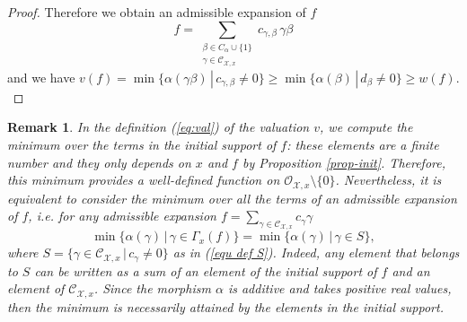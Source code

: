 \documentclass{amsart}%
\numberwithin{equation}{subsection}
\theoremstyle{plain2}
\theoremstyle{definition2}
\newtheorem{rem}[equation]{Remark}
\theoremstyle{stepstyle}
\theoremstyle{point}
\theoremstyle{subpoint}
\newcommand{\cX}{\ensuremath{\mathscr{X}}}
\newcommand{\caC}{\ensuremath{\mathcal{C}}}
\newcommand{\caO}{\ensuremath{\mathcal{O}}}
\begin{document}
\begin{proof}
Therefore we obtain an admissible expansion of $f$ $$f = \sum_{\substack{\beta \in C_\alpha \cup \{1\} \\ \gamma \in \caC_{\cX,x}}}c_{\gamma, \beta}\, \gamma\beta $$ and we have $v(f)=\min\{\alpha(\gamma \beta)\,|\,c_{\gamma, \beta}\neq 0\} \geqslant\min\{\alpha(\beta)\,|\,d_{\beta}\neq 0\} \geqslant w(f).$
\end{proof}
 
\begin{rem} \label{rem def-val}
In the definition (\ref{eq:val}) of the valuation $v$, we compute the minimum over the terms in the initial support of $f$: these elements are a finite number and they only depends on $x$ and $f$ by Proposition \ref{prop-init}. Therefore, this minimum provides a well-defined function on $\caO_{\cX,x} \setminus \{0\}$. Nevertheless, it is equivalent to consider the minimum over all the terms of an admissible expansion of $f$, i.e. for any admissible expansion $f=\sum_{\gamma \in \mathcal{C}_{\cX,x}}c_{\gamma}\gamma$ $$\min\{\alpha(\gamma)\,|\,\gamma\in \Gamma_x(f)\} = \min\{\alpha(\gamma)\,|\,\gamma\in S\},$$ where $S=\{\gamma\in\mathcal{C}_{\cX,x}\,|\,c_\gamma\neq 0\}$ as in (\ref{equ def S}). Indeed, any element that belongs to $S$ can be written as a sum of an element of the initial support of $f$ and an element of $\caC_{\cX,x}$. Since the morphism $\alpha$ is additive and takes positive real values, then the minimum is necessarily attained by the elements in the initial support.
\end{rem}
\end{document}
